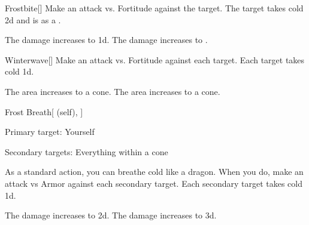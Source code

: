 \lowercase{\hypertarget{spell:Frostbite}{}}\label{spell:Frostbite}
\begin{freeability}[Rank 3]{\hypertarget{spell:Frostbite}{Frostbite}}[]
Make an attack vs. Fortitude against the target.
\hit The target takes cold  \minus2d and is  as a .

\rankline
{} The damage increases to  \minus1d.
 The damage increases to .
\end{freeability}
\vspace{0.25em}



\lowercase{\hypertarget{spell:Winterwave}{}}\label{spell:Winterwave}
\begin{freeability}[Rank 3]{\hypertarget{spell:Winterwave}{Winterwave}}[]
Make an attack vs. Fortitude against each target.
\hit Each target takes cold  \minus1d.

\rankline
{} The area increases to a \areahuge cone.
 The area increases to a \areaext cone.
\end{freeability}
\vspace{0.25em}



\lowercase{\hypertarget{spell:Frost Breath}{}}\label{spell:Frost Breath}
\begin{attuneability}[Rank 4]{\hypertarget{spell:Frost Breath}{Frost Breath}}[ (self), ]

Primary target: Yourself
\par\noindent
Secondary targets: Everything within a \arealarge cone

As a standard action, you can breathe cold like a dragon.
When you do, make an attack vs Armor against each secondary target.
\hit Each secondary target takes cold  \plus1d.

\rankline
{} The damage increases to  \plus2d.
 The damage increases to  \plus3d.
\end{attuneability}
\vspace{0.25em}



